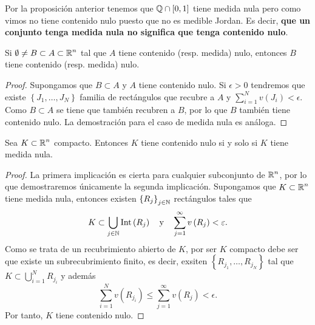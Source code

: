 \begin{eg}
	Por la proposición anterior tenemos que $\displaystyle \mathbb{Q} \cap \left[0,1\right]  $ tiene medida nula pero como vimos no tiene contenido nulo puesto que no es medible Jordan. Es decir, \textbf{que un conjunto tenga medida nula no significa que tenga contenido nulo}.
\end{eg}
\begin{prop}
Si $\displaystyle \emptyset \neq B \subset A \subset \mathbb{R}^{n} $ tal que $\displaystyle A $ tiene contenido (resp. medida) nulo, entonces $\displaystyle B $ tiene contenido (resp. medida) nulo.
\end{prop}
\begin{proof}
	Supongamos que $\displaystyle B \subset A $ y $\displaystyle A $ tiene contenido nulo. Si $\displaystyle \epsilon > 0 $ tendremos que existe $\displaystyle \left\{ J_{1}, \ldots, J_{N}\right\}  $ familia de rectángulos que recubre a $\displaystyle A $ y $\displaystyle \sum^{N}_{i = 1}v\left(J_{i}\right) < \epsilon  $. Como $\displaystyle B \subset A $ se tiene que también recubren a $\displaystyle B $, por lo que $\displaystyle B $ también tiene contenido nulo. La demostración para el caso de medida nula es análoga.
\end{proof}
\begin{theorem}
Sea $\displaystyle K \subset \mathbb{R}^{n} $ compacto. Entonces $\displaystyle K $ tiene contenido nulo si y solo si $\displaystyle K $ tiene medida nula.
\end{theorem}
\begin{proof}
	La primera implicación es cierta para cualquier subconjunto de $\displaystyle \mathbb{R}^{n} $, por lo que demostraremos únicamente la segunda implicación. Supongamos que $\displaystyle K \subset \mathbb{R}^{n} $ tiene medida nula, entonces existen $\displaystyle \left\{ R_{j}\right\} _{j \in \mathbb{N}} $ rectángulos tales que 
	\[K \subset \bigcup_{j \in \mathbb{N}}\operatorname{Int}\left(R_{j}\right) \quad \text{y} \quad \sum^{\infty}_{j= 1}v\left(R_{j}\right)< \varepsilon  .\]
	Como se trata de un recubrimiento abierto de $\displaystyle K $, por ser $\displaystyle K $ compacto debe ser que existe un subrecubrimiento finito, es decir, exsiten $\displaystyle \left\{ R_{j_{1}}, \ldots, R_{j_{N}}\right\}  $ tal que $\displaystyle K \subset \bigcup_{i = 1}^{N}R_{j_{i}} $ y además
	\[\sum^{N}_{i=1}v\left(R_{j_{i}}\right)\leq \sum^{\infty}_{j = 1}v\left(R_{j}\right) < \epsilon  .\]
	Por tanto, $\displaystyle K $ tiene contenido nulo.
\end{proof}

